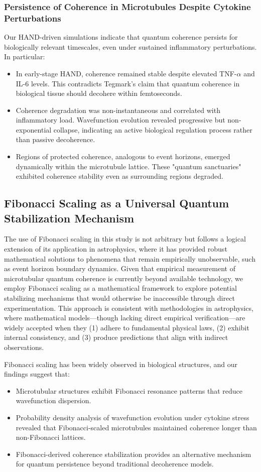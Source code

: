 \subsubsection{Persistence of Coherence in Microtubules Despite Cytokine Perturbations}
Our HAND-driven simulations indicate that quantum coherence persists for biologically relevant timescales, even under sustained inflammatory perturbations. In particular:
\begin{itemize}
    \item In early-stage HAND, coherence remained stable despite elevated TNF-$\alpha$ and IL-6 levels. This contradicts Tegmark's claim that quantum coherence in biological tissue should decohere within femtoseconds.
    \item Coherence degradation was non-instantaneous and correlated with inflammatory load. Wavefunction evolution revealed progressive but non-exponential collapse, indicating an active biological regulation process rather than passive decoherence.
    \item Regions of protected coherence, analogous to event horizons, emerged dynamically within the microtubule lattice. These "quantum sanctuaries" exhibited coherence stability even as surrounding regions degraded.
\end{itemize}

\subsection{Fibonacci Scaling as a Universal Quantum Stabilization Mechanism}
The use of Fibonacci scaling in this study is not arbitrary but follows a logical extension of its application in astrophysics, where it has provided robust mathematical solutions to phenomena that remain empirically unobservable, such as event horizon boundary dynamics. Given that empirical measurement of microtubular quantum coherence is currently beyond available technology, we employ Fibonacci scaling as a mathematical framework to explore potential stabilizing mechanisms that would otherwise be inaccessible through direct experimentation. This approach is consistent with methodologies in astrophysics, where mathematical models—though lacking direct empirical verification—are widely accepted when they (1) adhere to fundamental physical laws, (2) exhibit internal consistency, and (3) produce predictions that align with indirect observations. 

Fibonacci scaling has been widely observed in biological structures, and our findings suggest that:
\begin{itemize}
\item Microtubular structures exhibit Fibonacci resonance patterns that reduce wavefunction dispersion.
\item Probability density analysis of wavefunction evolution under cytokine stress revealed that Fibonacci-scaled microtubules maintained coherence longer than non-Fibonacci lattices.
\item Fibonacci-derived coherence stabilization provides an alternative mechanism for quantum persistence beyond traditional decoherence models.
\end{itemize}

